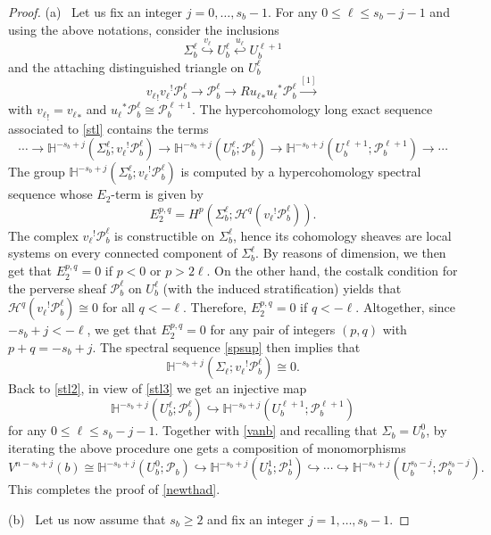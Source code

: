 \documentclass[12pt,leqno,twoside]{amsart}
\theoremstyle{remark}
\theoremstyle{remark}
\theoremstyle{definition}
\theoremstyle{remark}
\theoremstyle{remark}
\theoremstyle{remark}
\numberwithin{equation}{section}  %
\def\be{\begin{equation}}
\def\ee{\end{equation}}
\newcommand{\lra}{\longrightarrow}
\newcommand{\cH}{\mathcal{H}}
\newcommand{\cP}{\mathcal{P}}
\newcommand{\bH}{\mathbb{H}}
\begin{document}
\begin{proof}
(a) \  Let us fix an integer $j=0,\ldots, s_b-1$.  For any $0 \leq \ell \leq s_b-j-1$ and using the above notations, consider the inclusions
$$\Sigma_{b}^\ell \overset{v_\ell}{\hookrightarrow} U_{b}^\ell \overset{u_\ell}{\hookleftarrow} U_{b}^{\ell+1}$$
and the attaching distinguished triangle on $U_{b}^\ell$
\be\label{stl}{v_\ell}_!{v_\ell}^!\cP_{b}^\ell \lra \cP_{b}^\ell \lra R{u_\ell}_*{u_\ell}^*\cP_{b}^\ell \overset{[1]}{\lra}\ee
with ${v_\ell}_!={v_\ell}_*$ and ${u_\ell}^*\cP_{b}^\ell \cong \cP_{b}^{\ell+1}$. 
The hypercohomology long exact sequence associated to \eqref{stl} contains the terms
\be\label{stl2} \cdots \to \bH^{-s_b+j}(\Sigma_{b}^\ell; {v_\ell}^!\cP_b^\ell) \to \bH^{-s_b+j}(U_b^\ell;\cP_b^\ell) \to   \bH^{-s_b+j}(U_b^{\ell+1};\cP_b^{\ell+1}) \to \cdots\ee
The group $\bH^{-s_b+j}(\Sigma_b^\ell; {v_\ell}^!\cP_b^\ell)$ is computed by a hypercohomology spectral sequence whose $E_2$-term is given by
\be\label{spsup} E_2^{p,q}=H^p(\Sigma_b^\ell; \cH^q({v_\ell}^!\cP_b^\ell)).\ee
The complex ${v_\ell}^!\cP_b^\ell$ is  constructible on $\Sigma_b^\ell$, hence its cohomology sheaves are local systems on every connected component of $\Sigma_b^\ell$. By reasons of dimension, we then get that 
$E_2^{p,q}=0$ if $p<0$ or $p>2\ell$. On the other hand, the costalk condition for the perverse sheaf $\cP_b^\ell$ on $U_b^\ell$ (with the induced stratification) yields that $\cH^q({v_\ell}^!\cP_b^\ell) \cong 0$ for all $q < -\ell$. Therefore, $E_2^{p,q}=0$ if $q<-\ell$. 
Altogether, since $-s_b+j<-\ell$, we get that $E_2^{p,q}=0$ for any pair of integers $(p,q)$ with $p+q=-s_b+j$. The spectral sequence \eqref{spsup} then implies that 
\be\label{stl3}\bH^{-s_b+j}(\Sigma_\ell; {v_\ell}^!\cP_b^\ell)\cong 0.\ee
Back to \eqref{stl2}, in view of \eqref{stl3} we get an injective map
\be \bH^{-s_b+j}(U_b^\ell;\cP_b^\ell) \hookrightarrow   \bH^{-s_b+j}(U_b^{\ell+1};\cP_b^{\ell+1})\ee for any $0 \leq \ell \leq s_b-j-1$.
Together with \eqref{vanb} and recalling that $\Sigma_b=U_b^0$,  by iterating the above procedure one gets a composition of monomorphisms
$$V^{n-s_b+j}(b) \cong \bH^{-s_b+j}(U_b^0;\cP_b) \hookrightarrow  \bH^{-s_b+j}(U_b^1;\cP_b^1) \hookrightarrow \cdots \hookrightarrow  \bH^{-s_b+j}(U_b^{s_b-j};\cP_b^{s_b-j}).$$
This completes the proof of \eqref{newthad}.

 (b) \  Let us now assume that $s_b \geq 2$ and fix an integer $j=1,\ldots,s_b-1$. 


\end{proof}
\end{document}
